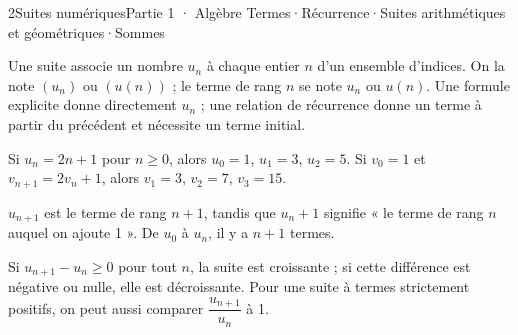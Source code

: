 \begin{ouverture}[suites]{2}{Suites numériques}{Partie 1 · Algèbre}
{Termes\enspace·\enspace Récurrence\enspace·\enspace Suites arithmétiques et géométriques\enspace·\enspace Sommes}
\end{ouverture}
\essentiel
{}
\begin{definition}
Une suite associe un nombre $u_n$ à chaque entier $n$ d'un ensemble d'indices.
On la note $(u_n)$ ou $(u(n))$ ; le terme de rang $n$ se note $u_n$ ou $u(n)$.
Une formule explicite donne directement $u_n$ ; une relation de récurrence
donne un terme à partir du précédent et nécessite un terme initial.
\end{definition}
\begin{exemple}
Si $u_n=2n+1$ pour $n\geq0$, alors $u_0=1$, $u_1=3$, $u_2=5$.
Si $v_0=1$ et $v_{n+1}=2v_n+1$, alors $v_1=3$, $v_2=7$, $v_3=15$.
\end{exemple}
\begin{attention}
$u_{n+1}$ est le terme de rang $n+1$, tandis que $u_n+1$ signifie « le terme
de rang $n$ auquel on ajoute 1 ». De $u_0$ à $u_n$, il y a $n+1$ termes.
\end{attention}
\begin{propriete}
Si $u_{n+1}-u_n\geq0$ pour tout $n$, la suite est croissante ; si cette
différence est négative ou nulle, elle est décroissante. Pour une suite à
termes strictement positifs, on peut aussi comparer $\dfrac{u_{n+1}}{u_n}$ à 1.
\end{propriete}
\begin{center}\par{}\end{center}
